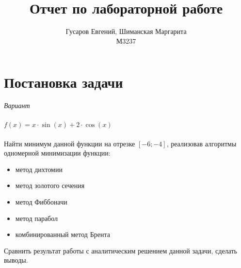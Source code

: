 \documentclass[12pt, a4paper]{article}
\title{\textbf{Отчет по лабораторной работе \textnumero{1}}}
\author{Гусаров Евгений, Шиманская Маргарита
\\М3237}
\begin{document}
    \maketitle
    \newpage


    \section{Постановка задачи}\label{sec:постановка-задачи}
    \Large\textit{Вариант }
    \\
    \\
    \Large\textit{$f(x) = x \cdot \sin(x) + 2 \cdot \cos(x)$}
    \\
    \\
    \Large{Найти минимум данной функции на отрезке $[-6; -4]$, реализовав алгоритмы одномерной минимизации функции:}
    \begin{itemize}
        \item {метод дихтомии}
        \item {метод золотого сечения}
        \item {метод Фиббоначи}
        \item {метод парабол}
        \item {комбинированный метод Брента}
    \end{itemize}

    \Large{Сравнить результат работы с аналитическим решением данной задачи, сделать выводы.}


    \newpage
\end{document}

